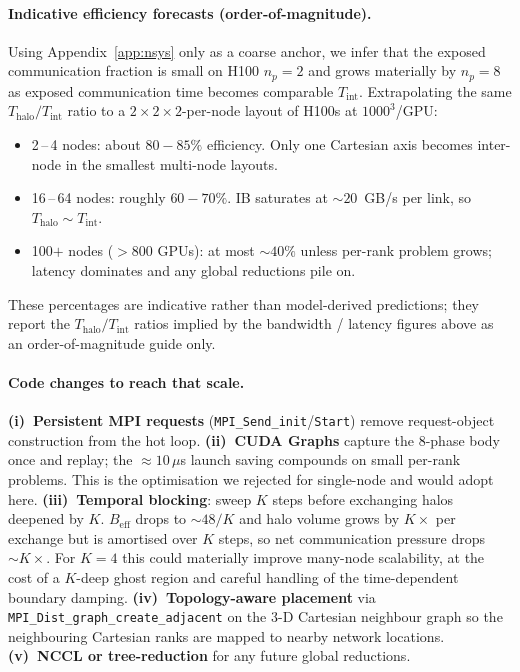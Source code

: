 \documentclass[10pt,a4paper]{article}
\begin{document}
\paragraph{Indicative efficiency forecasts (order-of-magnitude).}
Using Appendix~\ref{app:nsys} only as a coarse anchor, we infer that the exposed communication fraction is small on H100 $n_p{=}2$ and grows materially by $n_p{=}8$ as exposed communication time becomes comparable $T_{\text{int}}$. Extrapolating the same $T_{\text{halo}}/T_{\text{int}}$ ratio to a $2{\times}2{\times}2$-per-node layout of H100s at $1000^3$/GPU:
\begin{itemize}
\item 2\,--\,4 nodes: about $80\!-\!85\%$ efficiency. Only one Cartesian axis becomes inter-node in the smallest multi-node layouts.
\item 16\,--\,64 nodes: roughly $60\!-\!70\%$. IB saturates at $\sim\!20$~GB/s per link, so $T_{\text{halo}}{\sim}T_{\text{int}}$.
\item 100$+$ nodes ($>\!800$ GPUs): at most $\sim\!40\%$ unless per-rank problem grows; latency dominates and any global reductions pile on.
\end{itemize}
These percentages are indicative rather than model-derived predictions; they report the $T_{\text{halo}}/T_{\text{int}}$ ratios implied by the bandwidth / latency figures above as an order-of-magnitude guide only.

\paragraph{Code changes to reach that scale.}
\textbf{(i)~Persistent MPI requests} (\texttt{MPI\_Send\_init}/\texttt{Start}) remove request-object construction from the hot loop. \textbf{(ii)~CUDA Graphs} capture the 8-phase body once and replay; the $\approx\!10\,\mu$s launch saving compounds on small per-rank problems. This is the optimisation we rejected for single-node and would adopt here. \textbf{(iii)~Temporal blocking}: sweep $K$ steps before exchanging halos deepened by $K$. $B_{\text{eff}}$ drops to $\sim\!48/K$ and halo volume grows by $K\times$ per exchange but is amortised over $K$ steps, so net communication pressure drops $\sim\!K\times$. For $K{=}4$ this could materially improve many-node scalability, at the cost of a $K$-deep ghost region and careful handling of the time-dependent boundary damping. \textbf{(iv)~Topology-aware placement} via \texttt{MPI\_Dist\_graph\_create\_adjacent} on the 3-D Cartesian neighbour graph so the neighbouring Cartesian ranks are mapped to nearby network locations. \textbf{(v)~NCCL or tree-reduction} for any future global reductions.
\end{document}
